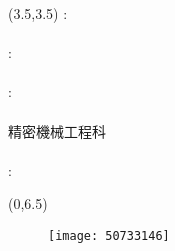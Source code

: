 	{\renewcommand\baselinestretch{0.99}\selectfont %
	{\begin{textblock}{15}(3.5,3.5)%
	\noindent\fontsize{16pt}{0em}\selectfont {}\enspace:\enspace
    \fontsize{16pt}{0em}\selectfont {}\\ \hspace*{\fill} \\[0.5em]
    \fontsize{16pt}{0em}\selectfont {}\enspace:\enspace
    \fontsize{16pt}{0em}\selectfont {} \\ %
    \hspace*{\fill} \\[0.5em]
    \fontsize{16pt}{0em}\selectfont {}\enspace:\enspace
    \fontsize{16pt}{0em}\selectfont {}\\ \hspace*{\fill} \\[0.5em]
    \fontsize{16pt}{0em}\selectfont \makebox[4em][s]{} \hspace{0.5em}
    \hspace{0.25em}精密機械工程科\\
    \hspace{0.5em} \\[0.5em]
    \fontsize{16pt}{0em}\selectfont {}\enspace:\enspace
    \end{textblock}}}
	{\begin{textblock}{6}(0,6.5)
	\begin{figure}
	\texttt{[image: 50733146]} 
	\end{figure}
	\end{textblock}}

